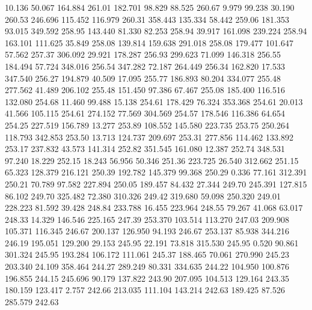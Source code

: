   10.136   50.067  164.884       261.01
 182.701   98.829   88.525       260.67
   9.979   99.238   30.190       260.53
 246.696  115.452  116.979       260.31
 358.443  135.334   58.442       259.06
 181.353   93.015  349.592       258.95
 143.440   81.330   82.253       258.94
  39.917  161.098  239.224       258.94
 163.101  111.625   35.849       258.08
 139.814  159.638  291.018       258.08
 179.477  101.647   57.562       257.37
 306.092   29.921  178.287       256.93
 299.623   71.099  146.318       256.55
 184.494   57.724  348.016       256.54
 347.282   72.187  264.449       256.34
 162.820   17.533  347.540       256.27
 194.879   40.509   17.095       255.77
 186.893   80.204  334.077       255.48
 277.562   41.489  206.102       255.48
 151.450   97.386   67.467       255.08
 185.400  116.516  132.080       254.68
  11.460   99.488   15.138       254.61
 178.429   76.324  353.368       254.61
  20.013   41.566  105.115       254.61
 274.152   77.569  304.569       254.57
 178.546  116.386   64.654       254.25
 227.519  156.789   13.277       253.89
 108.552  145.580  223.735       253.75
 250.264  118.793  342.853       253.50
  13.713  124.737  209.697       253.31
 277.856  114.462  133.892       253.17
 237.832   43.573  141.314       252.82
 351.545  161.080   12.387       252.74
 348.531   97.240   18.229       252.15
  18.243   56.956   50.346       251.36
 223.725   26.540  312.662       251.15
  65.323  128.379  216.121       250.39
 192.782  145.379   99.368       250.29
   0.336   77.161  312.391       250.21
  70.789   97.582  227.894       250.05
 189.457   84.432   27.344       249.70
 245.391  127.815   86.102       249.70
 325.482   72.380  310.326       249.42
 319.680   59.098  250.320       249.01
 228.223   81.592   39.428       248.84
 233.788   16.455  223.964       248.55
  79.267   41.068   63.017       248.33
  14.329  146.546  225.165       247.39
 253.370  103.514  113.270       247.03
 209.908  105.371  116.345       246.67
 200.137  126.950   94.193       246.67
 253.137   85.938  344.216       246.19
 195.051  129.200   29.153       245.95
  22.191   73.818  315.530       245.95
   0.520   90.861  301.324       245.95
 193.284  106.172  111.061       245.37
 188.465   70.061  270.990       245.23
 203.340   24.109  358.464       244.27
 289.249   80.331  334.635       244.22
 104.950  100.876  196.855       244.15
 245.696   90.179  137.822       243.90
 207.095  104.513  129.164       243.35
 180.159  123.417    2.757       242.66
 213.035  111.104  143.214       242.63
 189.425   87.526  285.579       242.63
